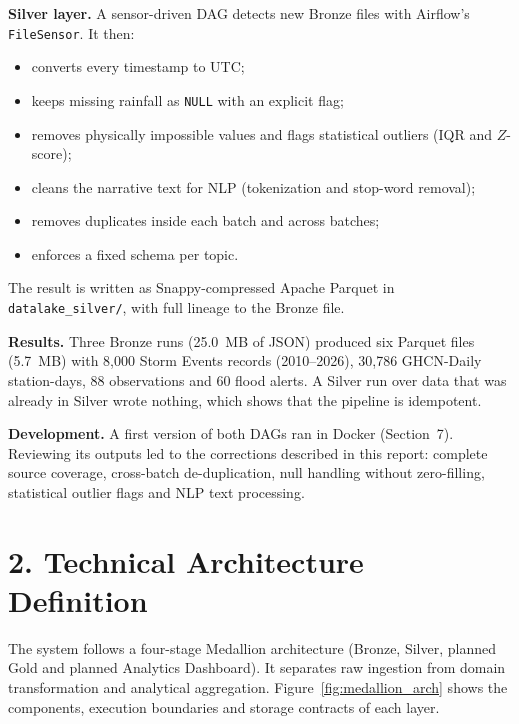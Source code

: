 \documentclass[stu, 12pt, letterpaper, donotrepeattitle, floatsintext, natbib]{apa7}
\begin{document}
\textbf{Silver layer.} A sensor-driven DAG detects new Bronze files with Airflow's \texttt{FileSensor}. It then:
\begin{itemize}
    \item converts every timestamp to UTC;
    \item keeps missing rainfall as \texttt{NULL} with an explicit flag;
    \item removes physically impossible values and flags statistical outliers (IQR and $Z$-score);
    \item cleans the narrative text for NLP (tokenization and stop-word removal);
    \item removes duplicates inside each batch and across batches;
    \item enforces a fixed schema per topic.
\end{itemize}
The result is written as Snappy-compressed Apache Parquet in \texttt{datalake\_silver/}, with full lineage to the Bronze file.

\textbf{Results.} Three Bronze runs (25.0~MB of JSON) produced six Parquet files (5.7~MB) with 8,000 Storm Events records (2010--2026), 30,786 GHCN-Daily station-days, 88 observations and 60 flood alerts. A Silver run over data that was already in Silver wrote nothing, which shows that the pipeline is idempotent.

\textbf{Development.} A first version of both DAGs ran in Docker (Section~7). Reviewing its outputs led to the corrections described in this report: complete source coverage, cross-batch de-duplication, null handling without zero-filling, statistical outlier flags and NLP text processing.

\section{\large 2. Technical Architecture Definition}
The system follows a four-stage Medallion architecture (Bronze, Silver, planned Gold and planned Analytics Dashboard). It separates raw ingestion from domain transformation and analytical aggregation. Figure~\ref{fig:medallion_arch} shows the components, execution boundaries and storage contracts of each layer.
\end{document}
